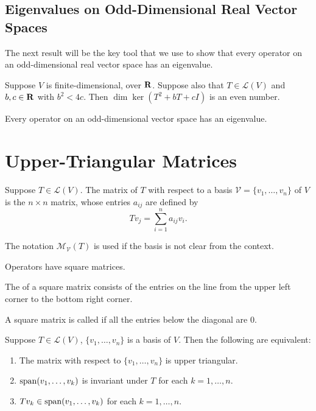 \subsection{Eigenvalues on Odd-Dimensional Real Vector Spaces}
The next result will be the key tool that we use to show that every operator on an odd-dimensional real vector space has an eigenvalue.

\begin{proposition}
Suppose $V$ is finite-dimensional, over $\mathbf R$. Suppose also that $T\in\mathcal{L}(V)$ and $b,c\in\mathbf R$ with $b^2<4c$. Then $\dim\ker(T^2+bT+cI)$ is an even number.
\end{proposition}

\begin{proposition}
Every operator on an odd-dimensional vector space has an eigenvalue.
\end{proposition}
\pagebreak

\section{Upper-Triangular Matrices}
\begin{definition}
Suppose $T\in\mathcal{L}(V)$. The matrix of $T$ with respect to a basis $\mathcal{V}=\{v_1,\dots,v_n\}$ of $V$ is the $n\times n$ matrix, whose entries $a_{ij}$ are defined by
\[Tv_j=\sum_{i=1}^{n}a_{ij}v_i.\]
\end{definition}

\begin{notation}
The notation $\mathcal{M}_\mathcal{V}(T)$ is used if the basis is not clear from the context.
\end{notation}

\begin{remark}
Operators have square matrices.
\end{remark}

\begin{definition}
The  of a square matrix consists of the entries on the line from the upper left corner to the bottom right corner.
\end{definition}

\begin{definition}
A square matrix is called  if all the entries below the diagonal are $0$.
\end{definition}

\begin{lemma}
Suppose $T\in\mathcal{L}(V)$, $\{v_1,\dots,v_n\}$ is a basis of $V$. Then the following are equivalent:
\begin{enumerate}[label=(\roman*)]
\item The matrix with respect to $\{v_1,\dots,v_n\}$ is upper triangular.
\item $\operatorname{span}(v_1,\dots,v_k)$ is invariant under $T$ for each $k=1,\dots,n$.
\item $Tv_k\in\operatorname{span}(v_1,\dots,v_k)$ for each $k=1,\dots,n$.
\end{enumerate}
\end{lemma}

